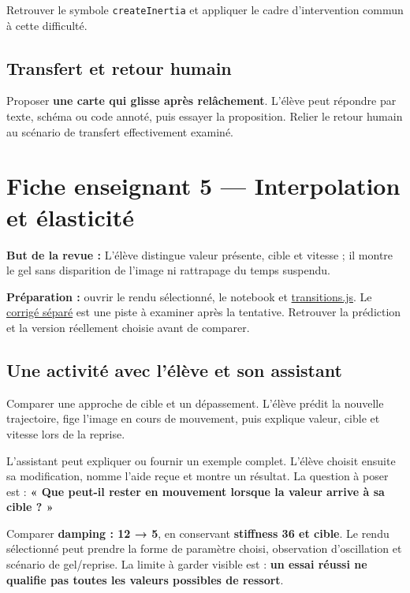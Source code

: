 \documentclass[
  canadien,
  11pt,
  a4paper,
]{report}
\begin{document}
Retrouver le symbole \texttt{create\allowbreak{}Inertia} et appliquer le cadre
d'intervention commun à cette difficulté.

\section{Transfert et retour humain}\label{transfert-et-retour-humain-3}

Proposer \textbf{une carte qui glisse après relâchement}. L'élève peut
répondre par texte, schéma ou code annoté, puis essayer la proposition.
Relier le retour humain au scénario de transfert effectivement examiné.

\chapter{Fiche enseignant 5 --- Interpolation et
élasticité}\label{fiche-enseignant-5-interpolation-et-uxe9lasticituxe9}

\textbf{But de la revue :} L'élève distingue valeur présente, cible et
vitesse ; il montre le gel sans disparition de l'image ni rattrapage du
temps suspendu.

\textbf{Préparation :} ouvrir le rendu sélectionné, le notebook et
\href{../../frontend/module-5/transitions.js}{transitions.js}. Le
\href{../../notebooks/instructor/module-5.ipynb}{corrigé séparé} est une
piste à examiner après la tentative. Retrouver la prédiction et la
version réellement choisie avant de comparer.

\section{Une activité avec l'élève et son
assistant}\label{une-activituxe9-avec-luxe9luxe8ve-et-son-assistant-4}

Comparer une approche de cible et un dépassement. L'élève prédit la
nouvelle trajectoire, fige l'image en cours de mouvement, puis explique
valeur, cible et vitesse lors de la reprise.

L'assistant peut expliquer ou fournir un exemple complet. L'élève
choisit ensuite sa modification, nomme l'aide reçue et montre un
résultat. La question à poser est : \textbf{« Que peut-il rester en
mouvement lorsque la valeur arrive à sa cible ? »}

Comparer \textbf{damping : 12 → 5}, en conservant \textbf{stiffness 36
et cible}. Le rendu sélectionné peut prendre la forme de paramètre
choisi, observation d'oscillation et scénario de gel/reprise. La limite
à garder visible est : \textbf{un essai réussi ne qualifie pas toutes
les valeurs possibles de ressort}.
\end{document}

